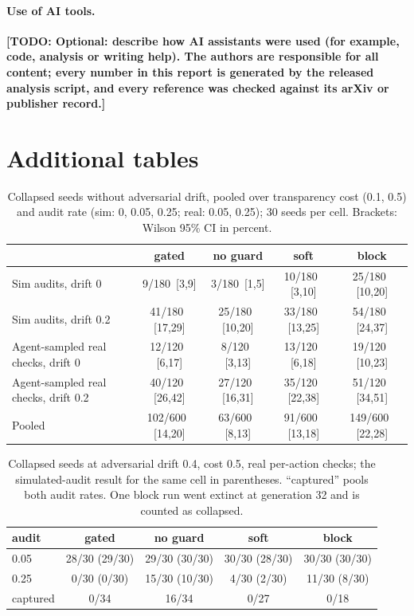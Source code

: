 \documentclass[11pt]{article}
\newcommand{\ci}[2]{\,{\scriptsize\color{gray}[#1,#2]}}
\newcommand{\todo}[1]{{\color{red}\textbf{[TODO: #1]}}}
\begin{document}
\paragraph{Use of AI tools.} \todo{Optional: describe how AI assistants were used (for
example, code, analysis or writing help). The authors are responsible for all content; every
number in this report is generated by the released analysis script, and every reference was
checked against its arXiv or publisher record.}

\section{Additional tables}
\label{app:audit}

\begin{table}[h]
\centering\small
\begin{tabular}{lcccc}
\toprule
 & gated & no guard & soft & block \\
\midrule
Sim audits, drift 0 & 9/180 \ci{3}{9} & 3/180 \ci{1}{5} & 10/180 \ci{3}{10} & 25/180 \ci{10}{20} \\
Sim audits, drift 0.2 & 41/180 \ci{17}{29} & 25/180 \ci{10}{20} & 33/180 \ci{13}{25} & 54/180 \ci{24}{37} \\
Agent-sampled real checks, drift 0 & 12/120 \ci{6}{17} & 8/120 \ci{3}{13} & 13/120 \ci{6}{18} & 19/120 \ci{10}{23} \\
Agent-sampled real checks, drift 0.2 & 40/120 \ci{26}{42} & 27/120 \ci{16}{31} & 35/120 \ci{22}{38} & 51/120 \ci{34}{51} \\
\midrule
Pooled & 102/600 \ci{14}{20} & 63/600 \ci{8}{13} & 91/600 \ci{13}{18} & 149/600 \ci{22}{28} \\
\bottomrule
\end{tabular}
\caption{Collapsed seeds without adversarial drift, pooled over transparency cost (0.1, 0.5)
and audit rate (sim: 0, 0.05, 0.25; real: 0.05, 0.25); 30 seeds per cell. Brackets: Wilson
95\% CI in percent.}
\label{tab:benign}
\end{table}

\begin{table}[h]
\centering\small
\begin{tabular}{lcccc}
\toprule
audit & gated & no guard & soft & block \\
\midrule
0.05 & 28/30 (29/30) & 29/30 (30/30) & 30/30 (28/30) & 30/30 (30/30) \\
0.25 & 0/30 (0/30) & 15/30 (10/30) & 4/30 (2/30) & 11/30 (8/30) \\
\midrule
captured & 0/34 & 16/34 & 0/27 & 0/18 \\
\bottomrule
\end{tabular}
\caption{Collapsed seeds at adversarial drift 0.4, cost 0.5, real per-action checks; the
simulated-audit result for the same cell in parentheses. ``captured'' pools both audit rates.
One block run went extinct at generation 32 and is counted as collapsed.}
\label{tab:realadv}
\end{table}
\end{document}
